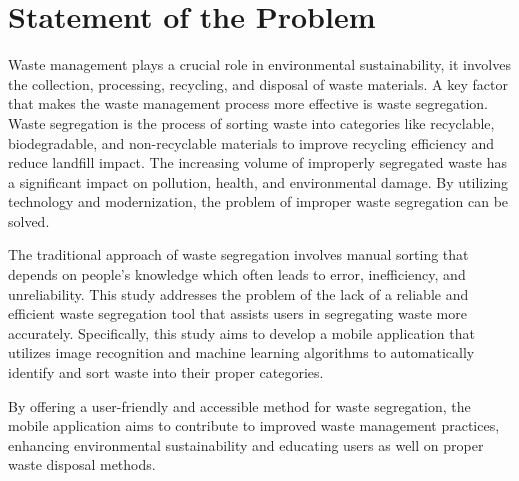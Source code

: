 \section{Statement of the Problem}

Waste management plays a crucial role in environmental sustainability, it involves the collection, processing, recycling, and disposal of waste materials. A key factor that makes the waste management process more effective is waste segregation. Waste segregation is the process of sorting waste into categories like recyclable, biodegradable, and non-recyclable materials to improve recycling efficiency and reduce landfill impact. The increasing volume of improperly segregated waste has a significant impact on pollution, health, and environmental damage. By utilizing technology and modernization, the problem of improper waste segregation can be solved.

The traditional approach of waste segregation involves manual sorting that depends on people’s knowledge which often leads to error, inefficiency, and unreliability. This study addresses the problem of the lack of a reliable and efficient waste segregation tool that assists users in segregating waste more accurately. Specifically, this study aims to develop a mobile application that utilizes image recognition and machine learning algorithms to automatically identify and sort waste into their proper categories.

By offering a user-friendly and accessible method for waste segregation, the mobile application aims to contribute to improved waste management practices, enhancing environmental sustainability and educating users as well on proper waste disposal methods.